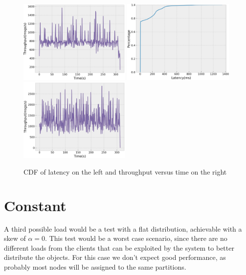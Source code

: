 \begin{figure}[H]
  \includegraphics[width=0.49\textwidth,height=\textheight,keepaspectratio]{img/global5_tp.png}
  \includegraphics[width=0.49\textwidth,height=\textheight,keepaspectratio]{img/global1_lat.png}
  \includegraphics[width=0.49\textwidth,height=\textheight,keepaspectratio]{img/global1_tp.png}
  \caption{ CDF of latency on the left and throughput versus time on the right }
  \label{fig:global50-performance}
\end{figure}

\section{Constant}\label{sec:constant}
A third possible load would be a test with a flat distribution, achievable with a skew of $\alpha = 0$. This test would be a worst case scenario, since there are no different loads from the clients that can be exploited by the system to better distribute the objects. For this case we don't expect good performance, as probably most nodes will be assigned to the same partitions.

